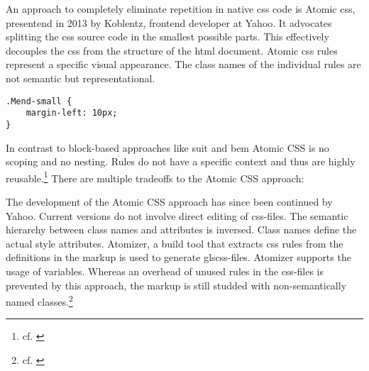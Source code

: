 An approach to completely eliminate repetition in native \gls{css} code is Atomic \gls{css}, presentend in 2013 by Koblentz, frontend developer at Yahoo.
It advocates splitting the \gls{css} source code in the smallest possible parts.
This effectively decouples the \gls{css} from the structure of the \gls{html} document.
Atomic \gls{css} rules represent a specific visual appearance.
The class names of the individual rules are not semantic but representational.


\begin{verbatim}
.Mend-small {
    margin-left: 10px;
}
\end{verbatim}

In contrast to block-based approaches like \gls{suit} and \gls{bem} Atomic CSS is no scoping and no nesting.
Rules do not have a specific context and thus are highly reusable.\footnote{cf. \cite{atomiccssarticle}}
There are multiple tradeoffs to the Atomic CSS approach:


The development of the Atomic CSS approach has since been continued by Yahoo.
Current versions do not involve direct editing of \gls{css}-files.
The semantic hierarchy between class names and attributes is inversed.
Class names define the actual style attributes.
Atomizer, a build tool that extracts \gls{css} rules from the definitions in the markup is used to generate gls{css}-files.
Atomizer supports the usage of variables.
Whereas an overhead of unused rules in the \gls{css}-files is prevented by this approach, the markup is still studded with non-semantically named classes.\footnote{cf. \cite{atomiccsssite}}



